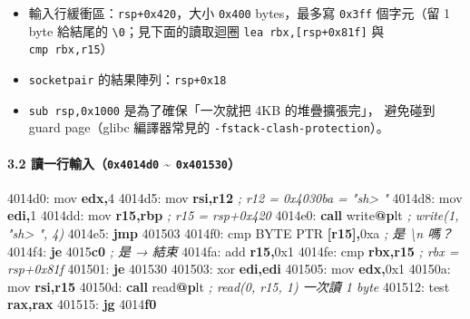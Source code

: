 \documentclass[10pt,a4paper]{article}
\newenvironment{Shaded}{\begin{snugshade}}{\end{snugshade}}
\newcommand{\BaseNTok}[1]{\textcolor[rgb]{0.00,0.00,0.81}{#1}}
\newcommand{\BuiltInTok}[1]{#1}
\newcommand{\CommentTok}[1]{\textcolor[rgb]{0.56,0.35,0.01}{\textit{#1}}}
\newcommand{\ControlFlowTok}[1]{\textcolor[rgb]{0.13,0.29,0.53}{\textbf{#1}}}
\newcommand{\DataTypeTok}[1]{\textcolor[rgb]{0.13,0.29,0.53}{#1}}
\newcommand{\DecValTok}[1]{\textcolor[rgb]{0.00,0.00,0.81}{#1}}
\newcommand{\ErrorTok}[1]{\textcolor[rgb]{0.64,0.00,0.00}{\textbf{#1}}}
\newcommand{\FunctionTok}[1]{\textcolor[rgb]{0.13,0.29,0.53}{\textbf{#1}}}
\newcommand{\KeywordTok}[1]{\textcolor[rgb]{0.13,0.29,0.53}{\textbf{#1}}}
\newcommand{\NormalTok}[1]{#1}
\newcommand{\OperatorTok}[1]{\textcolor[rgb]{0.81,0.36,0.00}{\textbf{#1}}}
\renewenvironment{Shaded}{%
  \def\FrameCommand{\fboxsep=3.2pt\colorbox{shadecolor}}%
  \MakeFramed{\advance\hsize-\width\FrameRestore\small}%
}{%
  \endMakeFramed
}
\providecommand{\tightlist}{%
  \setlength{\itemsep}{0pt}\setlength{\parskip}{0pt}}
\begin{document}
\begin{itemize}
\tightlist
\item
  輸入行緩衝區：\texttt{rsp+0x420}，大小 \texttt{0x400} bytes，最多寫
  \texttt{0x3ff} 個字元（留 1 byte 給結尾的
  \texttt{\textbackslash{}\allowbreak{}0}；見下面的讀取迴圈
  \texttt{lea\ \allowbreak{}rbx,{[}rsp+0x81f{]}} 與 \texttt{cmp\ \allowbreak{}rbx,\allowbreak{}r15}）
\item
  \texttt{socketpair} 的結果陣列：\texttt{rsp+0x18}
\item
  \texttt{sub\ \allowbreak{}rsp,\allowbreak{}0x1000} 是為了確保「一次就把 4KB 的堆疊擴張完」，
  避免碰到 guard page（glibc 編譯器常見的
  \texttt{-\allowbreak{}fstack-\allowbreak{}clash-\allowbreak{}protection}）。
\end{itemize}

\paragraph{\texorpdfstring{3.2 讀一行輸入（\texttt{0x4014d0}
\textasciitilde{}
\texttt{0x401530}）}{3.2 讀一行輸入（0x4014d0 \textasciitilde{} 0x401530）}}\label{ux8b80ux4e00ux884cux8f38ux51650x4014d0-0x401530}

\begin{Shaded}
\begin{Highlighting}[]
\NormalTok{4014d0:  }\BuiltInTok{mov} \KeywordTok{edx}\OperatorTok{,}\DecValTok{4}
\NormalTok{4014d5:  }\BuiltInTok{mov} \KeywordTok{rsi}\OperatorTok{,}\KeywordTok{r12}        \CommentTok{; r12 = 0x4030ba = "sh\textgreater{} "}
\NormalTok{4014d8:  }\BuiltInTok{mov} \KeywordTok{edi}\OperatorTok{,}\DecValTok{1}
\NormalTok{4014dd:  }\BuiltInTok{mov} \KeywordTok{r15}\OperatorTok{,}\KeywordTok{rbp}        \CommentTok{; r15 = rsp+0x420}
\NormalTok{4014e0:  }\ControlFlowTok{call}\NormalTok{ write}\FunctionTok{@}\ErrorTok{p}\NormalTok{lt     }\CommentTok{; write(1, "sh\textgreater{} ", 4)}
\NormalTok{4014e5:  }\ControlFlowTok{jmp} \DecValTok{401503}
\NormalTok{4014f0:  }\BuiltInTok{cmp} \DataTypeTok{BYTE} \DataTypeTok{PTR} \OperatorTok{[}\KeywordTok{r15}\OperatorTok{],}\BaseNTok{0xa}       \CommentTok{; 是 \textquotesingle{}\textbackslash{}n\textquotesingle{} 嗎？}
\NormalTok{4014f4:  }\ControlFlowTok{je}  \DecValTok{4015}\ErrorTok{c0}                   \CommentTok{; 是 → 結束}
\NormalTok{4014fa:  }\BuiltInTok{add} \KeywordTok{r15}\OperatorTok{,}\BaseNTok{0x1}
\NormalTok{4014fe:  }\BuiltInTok{cmp} \KeywordTok{rbx}\OperatorTok{,}\KeywordTok{r15}                  \CommentTok{; rbx = rsp+0x81f}
\NormalTok{401501:  }\ControlFlowTok{je}  \DecValTok{401530}
\NormalTok{401503:  }\BuiltInTok{xor} \KeywordTok{edi}\OperatorTok{,}\KeywordTok{edi}
\NormalTok{401505:  }\BuiltInTok{mov} \KeywordTok{edx}\OperatorTok{,}\BaseNTok{0x1}
\NormalTok{40150a:  }\BuiltInTok{mov} \KeywordTok{rsi}\OperatorTok{,}\KeywordTok{r15}
\NormalTok{40150d:  }\ControlFlowTok{call}\NormalTok{ read}\FunctionTok{@}\ErrorTok{p}\NormalTok{lt                }\CommentTok{; read(0, r15, 1)  一次讀 1 byte}
\NormalTok{401512:  }\BuiltInTok{test} \KeywordTok{rax}\OperatorTok{,}\KeywordTok{rax}
\NormalTok{401515:  }\ControlFlowTok{jg}  \DecValTok{4014}\ErrorTok{f0}
\end{Highlighting}
\end{Shaded}
\end{document}
